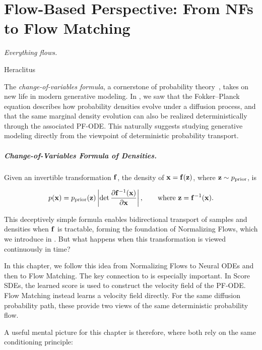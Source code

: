 \chapter{Flow-Based Perspective: From NFs to Flow Matching}\label{ch:flow-based}


\epigraph{
    \textit{Everything flows.
}}{Heraclitus}


The \emph{change-of-variables formula}, a cornerstone of probability
theory~\citep{tabak2010density,tabak2013family}, takes on new life in modern
generative modeling. In , we saw that the Fokker--Planck
equation describes how probability densities evolve under a diffusion process,
and that the same marginal density evolution can also be realized
deterministically through the associated PF-ODE. This naturally suggests
studying generative modeling directly from the viewpoint of deterministic
probability transport.

\paragraph{Change-of-Variables Formula of Densities.}
Given an invertible transformation ${\mathbf{f}}$, the density of
${\mathbf{x}}={\mathbf{f}}({\mathbf{z}})$, where ${\mathbf{z}}\sim p_{\mathrm{prior}}$, is
\begin{mdframed}
\begin{align}\label{eq:nf-change-of-var}
p({\mathbf{x}})
=
p_{\mathrm{prior}}({\mathbf{z}})
\left|
\det
\frac{\partial {\mathbf{f}}^{-1}({\mathbf{x}})}{\partial {\mathbf{x}}}
\right|,
\qquad
\text{where }
{\mathbf{z}}={\mathbf{f}}^{-1}({\mathbf{x}}).
\end{align}
\end{mdframed}
This deceptively simple formula enables bidirectional transport of samples and
densities when ${\mathbf{f}}$ is tractable, forming the foundation of Normalizing
Flows, which we introduce in . But what happens
when this transformation is viewed continuously in time?

In this chapter, we follow this idea from Normalizing Flows to Neural ODEs and
then to Flow Matching. The key connection to  is especially
important. In Score SDEs, the learned score is used to construct the velocity field of
the PF-ODE. Flow Matching instead learns a velocity field directly. For the
same diffusion probability path, these provide two views of the same
deterministic probability flow.

A useful mental picture for this chapter is therefore, where both rely on the same conditioning principle:



